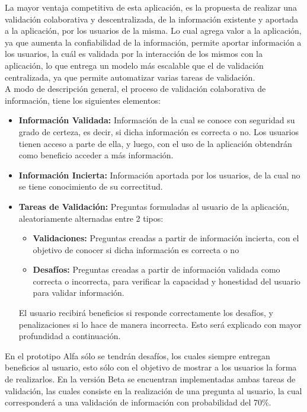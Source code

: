 \documentclass[10pt,letterpaper]{article}
\begin{document}
La mayor ventaja competitiva de esta aplicación, es la propuesta de realizar una validación colaborativa y descentralizada, de la información existente y aportada a la aplicación, por los usuarios de la misma. Lo cual agrega valor a la aplicación, ya que aumenta la confiabilidad de la información, permite aportar información a los usuarios, la cuál es validada por la interacción de los mismos con la aplicación, lo que entrega un modelo más escalable que el de validación centralizada, ya que permite automatizar varias tareas de validación.\\

A modo de descripción general, el proceso de validación colaborativa de información, tiene los siguientes elementos:\\

\begin{itemize}
 \item \textbf{Información Validada:} Información de la cual se conoce con seguridad su grado de certeza, es decir, si dicha información es correcta o no. Los usuarios tienen acceso a parte de ella, y luego, con el uso de la aplicación obtendrán como beneficio acceder a más información.
 \item \textbf{Información Incierta:} Información aportada por los usuarios, de la cual no se tiene conocimiento de su correctitud.
 \item \textbf{Tareas de Validación:} Preguntas formuladas al usuario de la aplicación, aleatoriamente alternadas entre 2 tipos:
  \begin{itemize}
   \item \textbf{Validaciones:} Preguntas creadas a partir de información incierta, con el objetivo de conocer si dicha información es correcta o no
   \item \textbf{Desafíos:} Preguntas creadas a partir de información validada como correcta o incorrecta, para verificar la capacidad y honestidad del usuario para validar información.
  \end{itemize}
  El usuario recibirá beneficios si responde correctamente los desafíos, y penalizaciones si lo hace de manera incorrecta. Esto será explicado con mayor profundidad a continuación.
\end{itemize}
  
  En el prototipo Alfa sólo se tendrán desafíos, los cuales siempre entregan beneficios al usuario, esto sólo con el objetivo de mostrar a los usuarios la forma de realizarlos. En la versión Beta se encuentran implementadas ambas tareas de validación, las cuales consiste en la realización de una pregunta al usuario, la cual corresponderá a una validación de información con probabilidad del 70\%.\\
\end{document}
